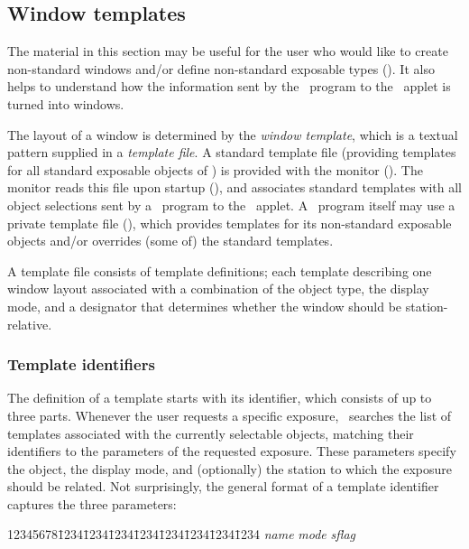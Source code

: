\subsection{Window templates}
\label{rm_ds_tp}

The material in this section may be useful for the user who would like to
create non-standard windows and/or define non-standard exposable types
().
It also helps to understand how the information
sent by the \smurph\ program to the \dsd\ applet is turned into windows.

The layout of a window is determined by the {\em window template}, which is
a textual pattern supplied in a {\em template file}.
A standard template file (providing templates
for all standard exposable objects of \smurph) is provided with the
monitor ().
The monitor reads this file upon startup (), and associates
standard templates with all object selections sent by a \smurph\ program
to the \dsd\ applet.
A \smurph\ program itself may use a private template file (),
which provides templates for its non-standard exposable objects and/or
overrides (some of) the standard templates.

A template file consists of template definitions; each template describing
one window layout associated with a combination of the object type,
the display mode, and a designator that determines whether the window
should be station-relative.

\subsubsection{Template identifiers}
\label{rm_ds_tp_ti}

The definition of a template starts with its identifier, which consists of
up to three parts.
Whenever the user requests a specific exposure,
\dsd\ searches the list of templates associated with the currently
selectable objects, matching their identifiers to the parameters of the
requested exposure.
These parameters specify the object, the display mode, and (optionally)
the station to which the exposure should be related.
Not surprisingly, the general format of a template identifier captures
the three parameters:

{\tt\begin{tabbing}
12345678\=1234\=1234\=1234\=1234\=1234\=1234\=1234\=1234\kill
\> {\em name\/} {\em mode\/} {\em sflag}
\end{tabbing}}

